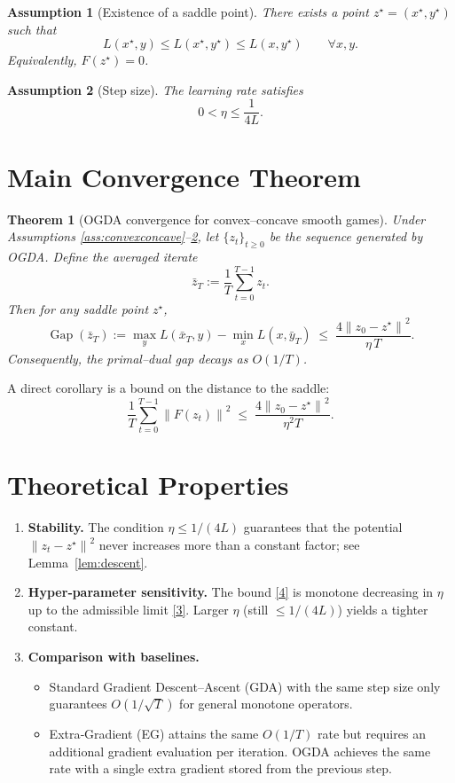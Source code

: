 \documentclass{article}
\newtheorem{theorem}{Theorem}
\newtheorem{assumption}{Assumption}
\newcommand{\norm}[1]{\left\lVert#1\right\rVert}
\begin{document}
\begin{assumption}[Existence of a saddle point]\label{ass:saddle}
There exists a point $z^{\star}=(x^{\star},y^{\star})$ such that
\[
L(x^{\star},y)\le L(x^{\star},y^{\star})\le L(x,y^{\star})\qquad\forall x,y.
\tag{2}
\]
Equivalently, $F(z^{\star})=0$.
\end{assumption}

\begin{assumption}[Step size]\label{ass:stepsize}
The learning rate satisfies
\[
0<\eta\le\frac{1}{4L}.
\tag{3}
\]
\end{assumption}

\section*{Main Convergence Theorem}
\begin{theorem}[OGDA convergence for convex–concave smooth games]\label{thm:ogda}
Under Assumptions \ref{ass:convexconcave}–\ref{ass:stepsize}, let $\{z_{t}\}_{t\ge0}$ be the sequence generated by OGDA. Define the averaged iterate
\[
\bar z_{T}:=\frac{1}{T}\sum_{t=0}^{T-1}z_{t}.
\]
Then for any saddle point $z^{\star}$,
\[
\boxed{
\operatorname{Gap}(\bar z_{T})
:=\max_{y}L(\bar x_{T},y)-\min_{x}L(x,\bar y_{T})
\;\le\;
\frac{4\norm{z_{0}-z^{\star}}^{2}}{\eta\,T}.
}
\tag{4}
\]
Consequently, the primal–dual gap decays as $O(1/T)$.
\end{theorem}

A direct corollary is a bound on the distance to the saddle:
\[
\frac{1}{T}\sum_{t=0}^{T-1}\norm{F(z_{t})}^{2}
\;\le\;
\frac{4\norm{z_{0}-z^{\star}}^{2}}{\eta^{2}T}.
\tag{5}
\]

\section*{Theoretical Properties}
\begin{enumerate}[label=\arabic*.]
\item \textbf{Stability.} The condition $\eta\le 1/(4L)$ guarantees that the potential
$\norm{z_{t}-z^{\star}}^{2}$ never increases more than a constant factor; see Lemma~\ref{lem:descent}.
\item \textbf{Hyper‑parameter sensitivity.} The bound \eqref{4} is monotone decreasing in $\eta$ up to the admissible limit \eqref{3}. Larger $\eta$ (still $\le 1/(4L)$) yields a tighter constant.
\item \textbf{Comparison with baselines.}
\begin{itemize}
\item Standard Gradient Descent–Ascent (GDA) with the same step size only guarantees $O(1/\sqrt{T})$ for general monotone operators.
\item Extra‑Gradient (EG) attains the same $O(1/T)$ rate but requires an additional gradient evaluation per iteration. OGDA achieves the same rate with a single extra gradient stored from the previous step.
\end{itemize}
\end{enumerate}
\end{document}

